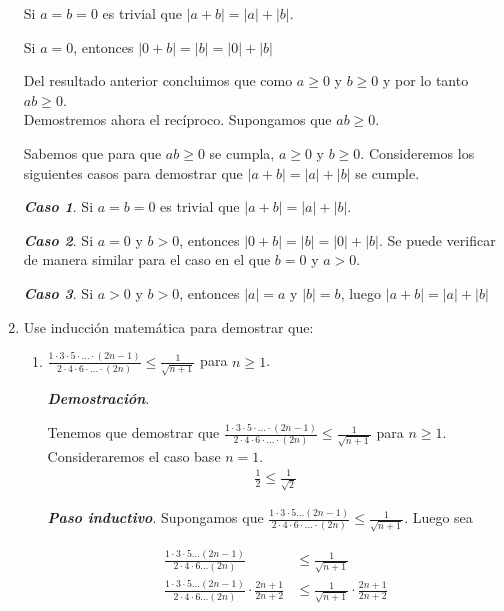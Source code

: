 \documentclass{report}
\begin{document}
\begin{enumerate}
        Si $a = b = 0$ es trivial que $|a+b| = |a| + |b|$.

        Si $a = 0$, entonces $|0+b| = |b| = |0| + |b|$

        Del resultado anterior concluimos que como $a \geq 0$ y $b \geq 0$ y por lo tanto $ab \geq 0$.\\

        Demostremos ahora el recíproco. Supongamos que $ab \geq 0$.

        Sabemos que para que $ab \geq 0$ se cumpla, $a \geq 0$ y $b \geq 0$. Consideremos los siguientes casos para demostrar que $|a+b| = |a| + |b|$ se cumple.

        \textit{\textbf{Caso 1}}. Si $a = b= 0$ es trivial que $|a+b| = |a| + |b|$.

        \textit{\textbf{Caso 2}}. Si $a = 0$ y $b > 0$, entonces $|0+b| = |b| = |0| + |b|$. Se puede verificar de manera similar para el caso en el que $b = 0$ y $a > 0$.

        \textit{\textbf{Caso 3}}. Si $a > 0$ y $b > 0$, entonces $|a| = a$ y $|b| = b$, luego $|a + b| = |a| + |b|$

        \item Use inducción matemática para demostrar que:

        \begin{enumerate}
            \item $\frac{1 \cdot 3 \cdot 5 \cdot \ldots \cdot (2n-1)}{2 \cdot 4 \cdot 6 \cdot \ldots \cdot (2n)} \leq \frac{1}{\sqrt{n+1}}$ para $n \geq 1$.

            \textit{\textbf{Demostración}}.

            Tenemos que demostrar que $\frac{1 \cdot 3 \cdot 5 \cdot \ldots \cdot (2n-1)}{2 \cdot 4 \cdot 6 \cdot \ldots \cdot (2n)} \leq \frac{1}{\sqrt{n+1}}$ para $n \geq 1$. Consideraremos el caso base $n = 1$.
            \begin{align*}
                \frac{1}{2} \leq \frac{1}{\sqrt{2}}
            \end{align*}

            \textit{\textbf{Paso inductivo}}. Supongamos que $\frac{1 \cdot 3 \cdot 5 \ldots (2n-1)}{2 \cdot 4 \cdot 6 \cdot \ldots \cdot (2n)} \leq \frac{1}{\sqrt{n+1}}$. Luego sea 

            \begin{align*}
                \frac{1 \cdot 3 \cdot 5 \ldots (2n-1)}{2 \cdot 4 \cdot 6 \ldots (2n)} &\leq \frac{1}{\sqrt{n+1}}\\
                \frac{1 \cdot 3 \cdot 5 \ldots (2n-1)}{2 \cdot 4 \cdot 6 \ldots (2n)} \cdot \frac{2n+1}{2n+2} &\leq \frac{1}{\sqrt{n+1}}\cdot \frac{2n+1}{2n+2}
            \end{align*}


\end{enumerate}
\end{enumerate}
\end{document}
